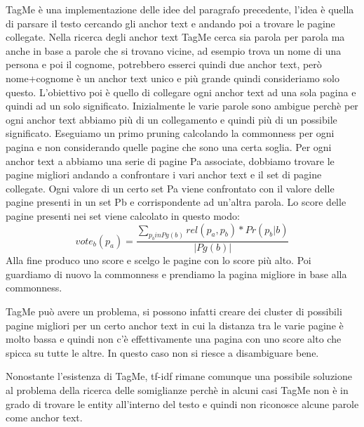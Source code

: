 \documentclass[14pt]{extreport}
\begin{document}
TagMe è una implementazione delle idee del paragrafo precedente, l'idea è quella di parsare il testo cercando gli anchor text e andando poi a trovare le pagine collegate.
Nella ricerca degli anchor text TagMe cerca sia parola per parola ma anche in base a parole che si trovano vicine, ad esempio trova un nome di una persona e poi il cognome, potrebbero esserci quindi due anchor text, però nome+cognome è un anchor text unico e più grande quindi consideriamo solo questo.
L'obiettivo poi è quello di collegare ogni anchor text ad una sola pagina e quindi ad un solo significato.
Inizialmente le varie parole sono ambigue perchè per ogni anchor text abbiamo più di un collegamento e quindi più di un possibile significato.
Eseguiamo un primo pruning calcolando la commonness per ogni pagina e non considerando quelle pagine che sono una certa soglia.
Per ogni anchor text a abbiamo una serie di pagine Pa associate, dobbiamo trovare le pagine migliori andando a confrontare i vari anchor text e il set di pagine collegate. Ogni valore di un certo set Pa viene confrontato con il valore delle pagine presenti in un set Pb e corrispondente ad un'altra parola.
Lo score delle pagine presenti nei set viene calcolato in questo modo:
\begin{equation}
    vote_b(p_a) = \frac{\sum \limits_{p_b in Pg(b)} rel(p_a, p_b) * Pr(p_b|b)}{|Pg(b)|}
\end{equation}
Alla fine produco uno score e scelgo le pagine con lo score più alto. Poi guardiamo di nuovo la commonness e prendiamo la pagina migliore in base alla commonness.

TagMe può avere un problema, si possono infatti creare dei cluster di possibili pagine migliori per un certo anchor text in cui la distanza tra le varie pagine è molto bassa e quindi non c'è effettivamente una pagina con uno score alto che spicca su tutte le altre. In questo caso non si riesce a disambiguare bene.

Nonostante l'esistenza di TagMe, tf-idf rimane comunque una possibile soluzione al problema della ricerca delle somiglianze perchè in alcuni casi TagMe non è in grado di trovare le entity all'interno del testo e quindi non riconosce alcune parole come anchor text.
\end{document}
